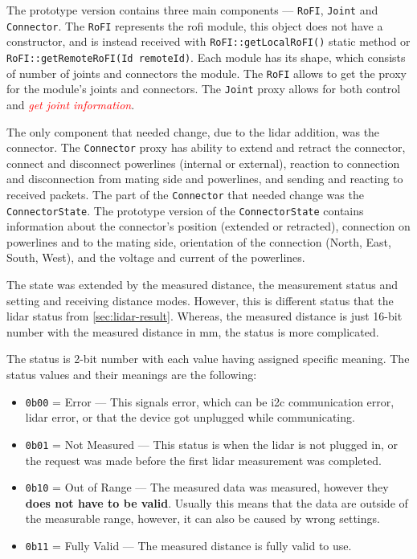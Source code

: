 \documentclass[
  digital,     %
  oneside,     %
  nosansbold,  %
  nocolorbold, %
  lof,         %
  lot,         %
]{fithesis4}
\newcommand{\TODO}[1]{\textcolor{red}{\textit{#1}}}
\begin{document}
{{{The prototype version contains three main components --- \lstinline[breakatwhitespace]|RoFI|, \lstinline|Joint| and \lstinline|Connector|. The \lstinline|RoFI| represents the \acrshort{rofi} module, this object does not have a constructor, and is instead received with \lstinline|RoFI::getLocalRoFI()| static method or \lstinline|RoFI::getRemoteRoFI(Id remoteId)|. Each module has its shape, which consists of number of joints and connectors the module. The \lstinline|RoFI| allows to get the proxy for the module's joints and connectors. The \lstinline|Joint| proxy allows for both control and \TODO{get joint information}.

The only component that needed change, due to the \acrshort{lidar} addition, was the connector. The \lstinline|Connector| proxy has ability to extend and retract the connector, connect and disconnect powerlines (internal or external), reaction to connection and disconnection from mating side and powerlines, and sending and reacting to received packets. The part of the \lstinline|Connector| that needed change was the \lstinline|ConnectorState|. The prototype version of the \lstinline|ConnectorState| contains information about the connector's position (extended or retracted), connection on powerlines and to the mating side, orientation of the connection (North, East, South, West), and the voltage and current of the powerlines.

The state was extended by the measured distance, the measurement status and setting and receiving distance modes. However, this is different status that the \acrshort{lidar} status from \ref{sec:lidar-result}. Whereas, the measured distance is just 16-bit number with the measured distance in \unit{\mm}, the status is more complicated.

The status is 2-bit number with each value having assigned specific meaning. The status values and their meanings are the following:
\begin{itemize}
    \item \lstinline|0b00| = Error --- This signals error, which can be  \acrshort{i2c} communication error, \acrshort{lidar} error, or that the device got unplugged while communicating.  
    \item \lstinline|0b01| = Not Measured --- This status is when the \acrshort{lidar} is not plugged in, or the request was made before the first \acrshort{lidar} measurement was completed.
    \item \lstinline|0b10| = Out of Range --- The measured data was measured, however they \textbf{does not have to be valid}. Usually this means that the data are outside of the measurable range, however, it can also be caused by wrong settings.
    \item \lstinline|0b11| = Fully Valid --- The measured distance is fully valid to use.
\end{itemize}

}}}
\end{document}

